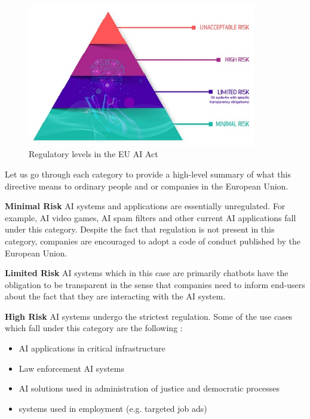\begin{figure}[htpb]
\begin{centering}
\includegraphics[width=10cm]{./assets/images/eu_ai_risks_pyramid.jpg}
\par\end{centering}
\caption{Regulatory levels in the EU AI Act \cite{eu_ai_regulation_picture}
 \label{fig:ai-act-pyramid}}
\end{figure}

Let us go through each category to provide a high-level summary of what this directive means to ordinary people and or companies in the European Union.

\textbf{Minimal Risk} AI systems and applications are essentially unregulated. For example, AI video games, AI spam filters and other current AI applications fall under this category. Despite the fact that regulation is not present in this category, companies are encouraged to adopt a code of conduct published by the European Union.

\textbf{Limited Risk} AI systems which in this case are primarily chatbots have the obligation to be transparent in the sense that companies need to inform end-users about the fact that they are interacting with the AI system.

\textbf{High Risk} AI systems undergo the strictest regulation. Some of the use cases which fall under this category are the following \cite{eu_ai_act_summary}:
\begin{itemize}
    \item AI applications in critical infrastructure
    \item Law enforcement AI systems
    \item AI solutions used in administration of justice and democratic processes
    \item systems used in employment (e.g. targeted job ads)
\end{itemize}

